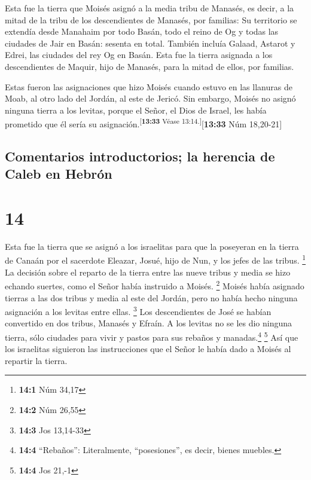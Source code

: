  Esta fue la tierra que Moisés asignó a la media tribu de
Manasés, es decir, a la mitad de la tribu de los descendientes de
Manasés, por familias:  Su territorio se extendía desde
Manahaim por todo Basán, todo el reino de Og y todas las ciudades de
Jair en Basán: sesenta en total.  También incluía Galaad,
Astarot y Edrei, las ciudades del rey Og en Basán. Esta fue la tierra
asignada a los descendientes de Maquir, hijo de Manasés, para la mitad
de ellos, por familias.

 Estas fueron las asignaciones que hizo Moisés cuando
estuvo en las llanuras de Moab, al otro lado del Jordán, al este de
Jericó.  Sin embargo, Moisés no asignó ninguna tierra a
los levitas, porque el Señor, el Dios de Israel, les había prometido que
él sería su asignación.\textsuperscript{{[}\textbf{13:33} Véase
13:14.{]}}{[}\textbf{13:33} Núm 18,20-21{]}

\hypertarget{comentarios-introductorios-la-herencia-de-caleb-en-hebruxf3n}{%
\subsection{Comentarios introductorios; la herencia de Caleb en
Hebrón}\label{comentarios-introductorios-la-herencia-de-caleb-en-hebruxf3n}}

\hypertarget{section-13}{%
\section{14}\label{section-13}}

 Esta fue la tierra que se asignó a los israelitas para
que la poseyeran en la tierra de Canaán por el sacerdote Eleazar, Josué,
hijo de Nun, y los jefes de las tribus. \footnote{\textbf{14:1} Núm
  34,17}  La decisión sobre el reparto de la tierra entre
las nueve tribus y media se hizo echando suertes, como el Señor había
instruido a Moisés. \footnote{\textbf{14:2} Núm 26,55} 
Moisés había asignado tierras a las dos tribus y media al este del
Jordán, pero no había hecho ninguna asignación a los levitas entre
ellas. \footnote{\textbf{14:3} Jos 13,14-33}  Los
descendientes de José se habían convertido en dos tribus, Manasés y
Efraín. A los levitas no se les dio ninguna tierra, sólo ciudades para
vivir y pastos para sus rebaños y manadas.\footnote{\textbf{14:4}
  ``Rebaños'': Literalmente, ``posesiones'', es decir, bienes muebles.}
\footnote{\textbf{14:4} Jos 21,-1}  Así que los israelitas
siguieron las instrucciones que el Señor le había dado a Moisés al
repartir la tierra.

